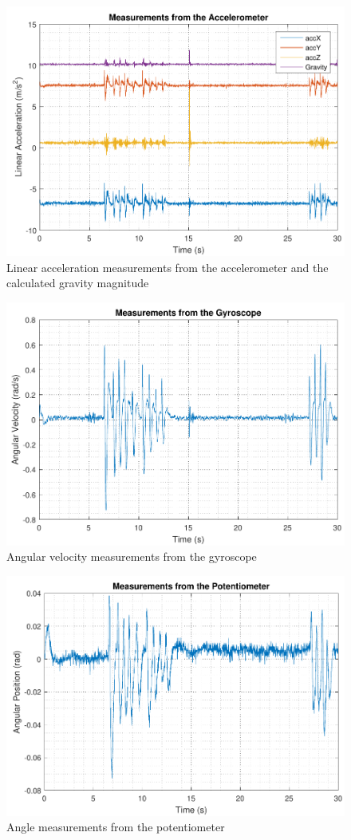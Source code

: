 \begin{figure}[H]
	\includegraphics[scale=.75]{figures/accData}
	\centering
	\caption{Linear acceleration measurements from the accelerometer and the calculated gravity magnitude}
\end{figure} \label{accData}
%
\begin{figure}[H]
	\includegraphics[scale=.75]{figures/gyroData}
	\centering
	\caption{Angular velocity measurements from the gyroscope}
\end{figure} \label{gyroData}
%
\begin{figure}[H]
	\includegraphics[scale=.75]{figures/potData}
	\centering
	\caption{Angle measurements from the potentiometer}
\end{figure} \label{potData}
